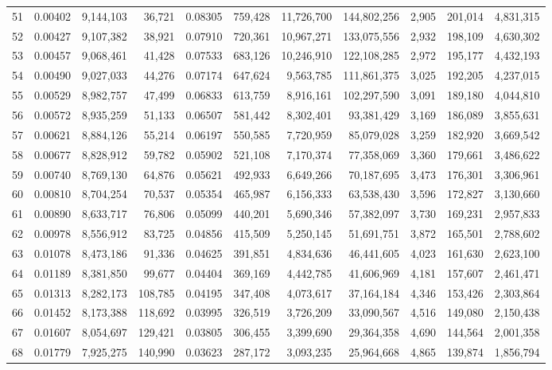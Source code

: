 \begin{landscape}
\begin{longtable}{rrrrrrrrrrr}
51 & 0.00402 & 9,144,103 & 36,721 & 0.08305 & 759,428 & 11,726,700 & 144,802,256 & 2,905 & 201,014 & 4,831,315 \\
52 & 0.00427 & 9,107,382 & 38,921 & 0.07910 & 720,361 & 10,967,271 & 133,075,556 & 2,932 & 198,109 & 4,630,302 \\
53 & 0.00457 & 9,068,461 & 41,428 & 0.07533 & 683,126 & 10,246,910 & 122,108,285 & 2,972 & 195,177 & 4,432,193 \\
54 & 0.00490 & 9,027,033 & 44,276 & 0.07174 & 647,624 & 9,563,785 & 111,861,375 & 3,025 & 192,205 & 4,237,015 \\
55 & 0.00529 & 8,982,757 & 47,499 & 0.06833 & 613,759 & 8,916,161 & 102,297,590 & 3,091 & 189,180 & 4,044,810 \\
56 & 0.00572 & 8,935,259 & 51,133 & 0.06507 & 581,442 & 8,302,401 & 93,381,429 & 3,169 & 186,089 & 3,855,631 \\
57 & 0.00621 & 8,884,126 & 55,214 & 0.06197 & 550,585 & 7,720,959 & 85,079,028 & 3,259 & 182,920 & 3,669,542 \\
58 & 0.00677 & 8,828,912 & 59,782 & 0.05902 & 521,108 & 7,170,374 & 77,358,069 & 3,360 & 179,661 & 3,486,622 \\
59 & 0.00740 & 8,769,130 & 64,876 & 0.05621 & 492,933 & 6,649,266 & 70,187,695 & 3,473 & 176,301 & 3,306,961 \\
60 & 0.00810 & 8,704,254 & 70,537 & 0.05354 & 465,987 & 6,156,333 & 63,538,430 & 3,596 & 172,827 & 3,130,660 \\
61 & 0.00890 & 8,633,717 & 76,806 & 0.05099 & 440,201 & 5,690,346 & 57,382,097 & 3,730 & 169,231 & 2,957,833 \\
62 & 0.00978 & 8,556,912 & 83,725 & 0.04856 & 415,509 & 5,250,145 & 51,691,751 & 3,872 & 165,501 & 2,788,602 \\
63 & 0.01078 & 8,473,186 & 91,336 & 0.04625 & 391,851 & 4,834,636 & 46,441,605 & 4,023 & 161,630 & 2,623,100 \\
64 & 0.01189 & 8,381,850 & 99,677 & 0.04404 & 369,169 & 4,442,785 & 41,606,969 & 4,181 & 157,607 & 2,461,471 \\
65 & 0.01313 & 8,282,173 & 108,785 & 0.04195 & 347,408 & 4,073,617 & 37,164,184 & 4,346 & 153,426 & 2,303,864 \\
66 & 0.01452 & 8,173,388 & 118,692 & 0.03995 & 326,519 & 3,726,209 & 33,090,567 & 4,516 & 149,080 & 2,150,438 \\
67 & 0.01607 & 8,054,697 & 129,421 & 0.03805 & 306,455 & 3,399,690 & 29,364,358 & 4,690 & 144,564 & 2,001,358 \\
68 & 0.01779 & 7,925,275 & 140,990 & 0.03623 & 287,172 & 3,093,235 & 25,964,668 & 4,865 & 139,874 & 1,856,794 \\

\end{longtable}
\end{landscape}

